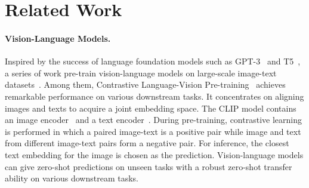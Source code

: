 \section{Related Work}
\label{sec:related_work}

\paragraph{Vision-Language Models.}
Inspired by the success of language foundation models such as GPT-3~\cite{brown2020language} and T5~\cite{raffel2020exploring}, a series of work pre-train vision-language models on large-scale image-text datasets~\cite{lei2021less,radford2021learning,jia2021scaling}. Among them, Contrastive Language-Vision Pre-training~\cite{radford2021learning} achieves remarkable performance on various downstream tasks. It concentrates on aligning images and texts to acquire a joint embedding space.
The CLIP model contains an image encoder~\cite{he2016deep,dosovitskiy2020image} and a text encoder~\cite{devlin2018bert}. During pre-training, contrastive learning is performed in which a paired image-text is a positive pair while image and text from different image-text pairs form a negative pair. 
For inference, the closest text embedding for the image is chosen as the prediction. Vision-language models can give zero-shot predictions on unseen tasks with a robust zero-shot transfer ability on various downstream tasks.


